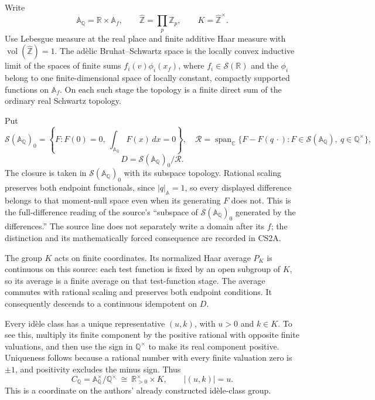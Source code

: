 Write \[
\mathbb A_{\mathbb Q}=\mathbb R\times\mathbb A_f,\qquad
\widehat{\mathbb Z}=\prod_p\mathbb Z_p,\qquad
K=\widehat{\mathbb Z}^{\times}.
\tag{CS1.1}
\] Use Lebesgue measure at the real place and finite additive Haar
measure with \(\operatorname{vol}(\widehat{\mathbb Z})=1\). The adèlic
Bruhat--Schwartz space is the locally convex inductive limit of the
spaces of finite sums \(f_i(v)\phi_i(x_f)\), where
\(f_i\in\mathcal S(\mathbb R)\) and the \(\phi_i\) belong to one
finite-dimensional space of locally constant, compactly supported
functions on \(\mathbb A_f\). On each such stage the topology is a
finite direct sum of the ordinary real Schwartz topology.

Put \[
\mathcal S(\mathbb A_{\mathbb Q})_0
=\left\{F:F(0)=0,\ \int_{\mathbb A_{\mathbb Q}}F(x)\,dx=0\right\},
\quad
\mathcal R=\operatorname{span}_{\mathbb C}
\{F-F(q\,\cdot):F\in\mathcal S(\mathbb A_{\mathbb Q}),\
q\in\mathbb Q^\times\},
\] \[
D=\mathcal S(\mathbb A_{\mathbb Q})_0/\overline{\mathcal R}.
\tag{CS1.2}
\] The closure is taken in \(\mathcal S(\mathbb A_{\mathbb Q})_0\) with
its subspace topology. Rational scaling preserves both endpoint
functionals, since \(|q|_{\mathbb A}=1\), so every displayed difference
belongs to that moment-null space even when its generating \(F\) does
not. This is the full-difference reading of the source's ``subspace of
\(\mathcal S(\mathbb A_{\mathbb Q})_0\) generated by the differences.''
The source line does not separately write a domain after its \(f\); the
distinction and its mathematically forced consequence are recorded in
CS2A.

The group \(K\) acts on finite coordinates. Its normalized Haar average
\(P_K\) is continuous on this source: each test function is fixed by an
open subgroup of \(K\), so its average is a finite average on that
test-function stage. The average commutes with rational scaling and
preserves both endpoint conditions. It consequently descends to a
continuous idempotent on \(D\).

Every idèle class has a unique representative \((u,k)\), with \(u>0\)
and \(k\in K\). To see this, multiply its finite component by the
positive rational with opposite finite valuations, and then use the sign
in \(\mathbb Q^\times\) to make its real component positive. Uniqueness
follows because a rational number with every finite valuation zero is
\(\pm1\), and positivity excludes the minus sign. Thus \[
C_{\mathbb Q}=\mathbb A_{\mathbb Q}^{\times}/\mathbb Q^\times
\ \cong\ \mathbb R_{>0}^{\times}\times K,\qquad |(u,k)|=u.
\tag{CS1.3}
\] This is a coordinate on the authors' already constructed idèle-class
group.

